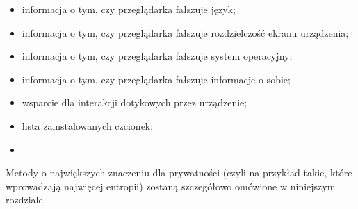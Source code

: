 \begin{itemize}
	\item informacja o tym, czy przeglądarka fałszuje język;
	\item informacja o tym, czy przeglądarka fałszuje rozdzielczość ekranu urządzenia;
	\item informacja o tym, czy przeglądarka fałszuje system operacyjny;
	\item informacja o tym, czy przeglądarka fałszuje informacje o sobie;
	\item wsparcie dla interakcji dotykowych przez urządzenie;
	\item lista zainstalowanych czcionek;
	\item
\end{itemize}

Metody o największych znaczeniu dla prywatności (czyli na przykład takie, które
wprowadzają najwięcej entropii) zostaną szczegółowo omówione w niniejszym
rozdziale.









